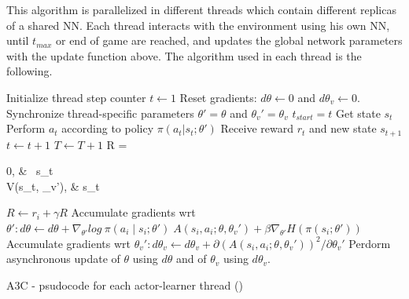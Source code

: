 This algorithm is parallelized in different threads which contain different replicas of a shared \ac{NN}.
Each thread interacts with the environment using his own \ac{NN}, until $t_{max}$ or end of game are reached, and updates the
global network parameters with the update function above.
The algorithm used in each thread is the following.

\begin{algorithm}[hbtp]
\begin{algorithmic}
    \State {}
    \State {}
    \State Initialize thread step counter $t \leftarrow 1$
    \Repeat
        \State Reset gradients: $d\theta \leftarrow 0$ and $d\theta_v \leftarrow 0$.
        \State Synchronize thread-specific parameters $\theta' = \theta$ and $\theta_v' = \theta_v$
        \State $t_{start} = t$
        \State Get state $s_t$
        \Repeat
            \State Perform $a_t$ according to policy $\pi(a_t|s_t;\theta')$
            \State Receive reward $r_t$ and new state $s_{t+1}$
            \State $t \leftarrow t + 1$
            \State $T \leftarrow T + 1$
        \State R = \begin{cases}
                0,   & \ s_t \\
                V(s_t, \theta_v'),   &  s_t \;\\
            \end{cases}
            \State $R \leftarrow r_i + \gamma R$
            \State Accumulate gradients wrt $\theta': d\theta \leftarrow d\theta + \nabla_{\theta'} log\:\pi(a_i\mid s_i;\theta')\;A(s_i,a_i;\theta,\theta_v')+\beta\nabla_{\theta'}H(\pi(s_i;\theta'))$
            \State Accumulate gradients wrt $\theta_v': d\theta_v \leftarrow d\theta_v + \partial(A(s_i,a_i;\theta,\theta_v'))^2 / \partial \theta_{v}'$
        \EndFor
        \State Perdorm asynchronous update of $\theta$ using $d\theta$ and of $\theta_v$ using $d\theta_v$.
\end{algorithmic}
\caption{\acl{A3C} - psudocode for each actor-learner thread (\cite{mnih2016A3C})}
\label{alg:A3C}
\end{algorithm}


